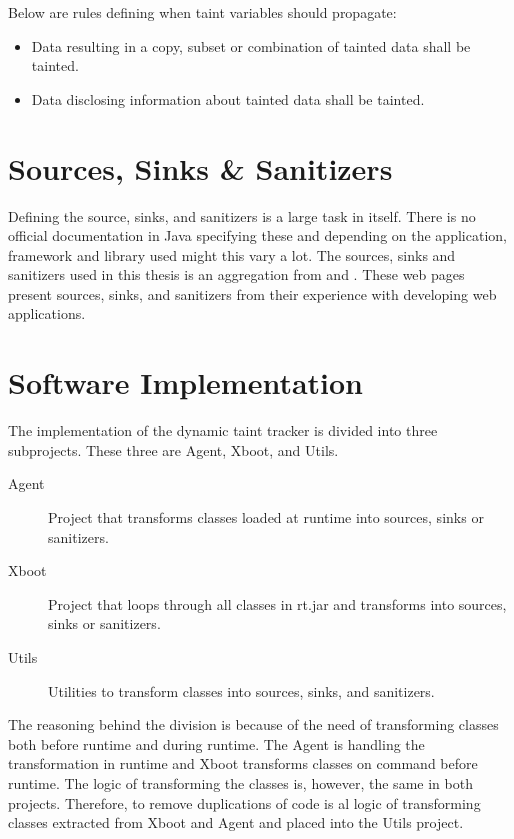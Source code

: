 Below are rules defining when taint variables should propagate:

\hfill
\begin{itemize}
    \item Data resulting in a copy, subset or combination of tainted data shall be tainted.
    \item Data disclosing information about tainted data shall be tainted.
\end{itemize}
\hfill



\section{Sources, Sinks \& Sanitizers}
Defining the source, sinks, and sanitizers is a large task in itself. There is no official documentation in Java specifying these and depending on the application, framework and library used might this vary a lot.  The sources, sinks and sanitizers used in this thesis is an aggregation from \textcite{sssCodeMaster} and \textcite{sssOWASP}. These web pages present sources, sinks, and sanitizers from their experience with developing web applications. 



\section{Software Implementation}
\label{SoftwareArchitecture}
The implementation of the dynamic taint tracker is divided into three subprojects. These three are Agent, Xboot, and Utils. 

\hfill
\begin{description}
    \item[Agent] Project that transforms classes loaded at runtime into sources, sinks or sanitizers.
    \item[Xboot] Project that loops through all classes in rt.jar and transforms into sources, sinks or sanitizers.
    \item[Utils] Utilities to transform classes into sources, sinks, and sanitizers. 
\end{description}
\hfill

The reasoning behind the division is because of the need of transforming classes both before runtime and during runtime. The Agent is handling the transformation in runtime and Xboot transforms classes on command before runtime. The logic of transforming the classes is, however, the same in both projects. Therefore, to remove duplications of code is al logic of transforming classes extracted from Xboot and Agent and placed into the Utils project.


